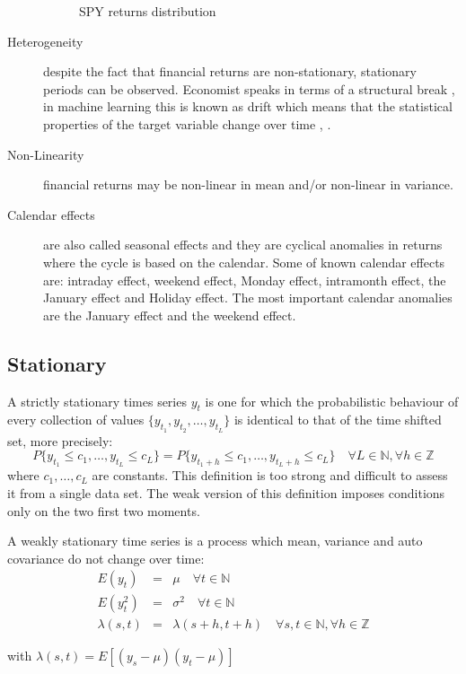 \begin{description}
\begin{figure}[h]
 \caption{SPY returns distribution}
 \label{fig:returndist}
\end{figure}
\item[Heterogeneity] despite the fact that financial returns are non-stationary,
stationary periods can be observed. Economist speaks in terms of a structural
break \cite{stock1994}, in machine learning this is known as drift which means
that the statistical properties of the target variable change over time
\cite{widmer1996}, \cite{tsymbal2004}.
\item[Non-Linearity] financial returns may be non-linear in mean and/or
non-linear in variance.
\item[Calendar effects] are also called seasonal effects and they are cyclical
anomalies in returns where the cycle is based on the calendar. Some of known
calendar effects are: intraday effect, weekend effect, Monday effect, intramonth
effect, the January effect and Holiday effect. The most important calendar
anomalies are the January effect and the weekend effect. 
\end{description}

\subsection{Stationary }
A strictly stationary times series $y_t$ is one for which the probabilistic behaviour
of every collection of values $\{y_{t_1},y_{t_2},\dots,y_{t_L}\}$ is identical
to that of the time shifted set, more precisely: \[ P\{y_{t_1} \leq
c_1,\dots,y_{t_L} \leq c_L\} = P\{y_{t_1+h} \leq c_1,\dots,y_{t_L+h} \leq c_L\}
\quad \forall L \in \mathbb{N}, \forall h \in \mathbb{Z}\] \noindent where
$c_1,\dots,c_L$ are constants.  This definition is too strong and difficult to
assess it from a single data set. The weak version of this definition imposes
conditions only on the two first two moments.

A weakly stationary time series is a process which mean, variance and auto
covariance do not change over time: \begin{eqnarray*} E(y_t) &=& \mu  \quad
\forall t \in \mathbb{N} \\ E(y^2_t) &=& \sigma^2  \quad \forall t \in
\mathbb{N} \\ \lambda(s,t)&=&\lambda(s+h,t+h) \quad \forall s,t \in \mathbb{N},
\forall h \in \mathbb{Z} \end{eqnarray*}

\noindent with $\lambda(s,t) = E[(y_s-\mu)(y_t - \mu)]$ 

